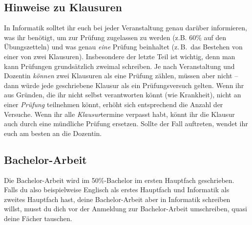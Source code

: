 \subsection{Hinweise zu Klausuren}
In Informatik solltet ihr euch bei jeder Veranstaltung genau darüber informieren, was ihr benötigt, um zur Prüfung zugelassen zu werden (z.B. 60\% auf den Übungszetteln) und was genau \emph{eine} Prüfung beinhaltet (z.\,B.\ das Bestehen von einer von zwei Klausuren). Insbesondere der letzte Teil ist wichtig, denn man kann Prüfungen grundsätzlich zweimal schreiben. Je nach Veranstaltung und Dozentin \emph{können} zwei Klausuren als eine Prüfung zählen, müssen aber nicht -- dann würde jede geschriebene Klausur als ein Prüfungsversuch gelten. Wenn ihr aus Gründen, die ihr nicht selbst verantworten könnt (wie Krankheit), nicht an einer \emph{Prüfung} teilnehmen könnt, erhöht sich entsprechend die Anzahl der Versuche. Wenn ihr alle \emph{Klausur}termine verpasst habt, könnt ihr die Klausur auch durch eine mündliche Prüfung ersetzen. Sollte der Fall auftreten, wendet ihr euch am besten an die Dozentin.

\subsection{Bachelor-Arbeit}
Die Bachelor-Arbeit wird im 50\%-Bachelor im ersten Hauptfach geschrieben. Falls du also beispielweise Englisch als erstes Hauptfach und Informatik als zweites Hauptfach hast, deine Bachelor-Arbeit aber in Informatik schreiben willst, musst du dich vor der Anmeldung zur Bachelor-Arbeit umschreiben, quasi deine Fächer tauschen. 
